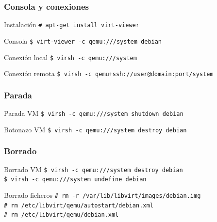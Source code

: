 \documentclass{beamer}
\begin{document}
\begin{frame}
  \frametitle{Consola y conexiones}
  \begin{block}{Instalación}
    \texttt{\# apt-get install virt-viewer}
  \end{block}
  \begin{block}{Consola}
    \texttt{\$ virt-viewer -c qemu:///system debian}
  \end{block}
  \bigskip
  \begin{block}{Conexión local}
    \texttt{\$ virsh -c qemu:///system}
  \end{block}
  \begin{block}{Conexión remota}
    \texttt{\$ virsh -c qemu+ssh://user@domain:port/system}
  \end{block}
\end{frame}

\begin{frame}
  \frametitle{Parada}
  \begin{block}{Parada VM}
    \texttt{\$ virsh -c qemu:///system shutdown debian}
  \end{block}
  \bigskip
  \begin{block}{Botonazo VM}
    \texttt{\$ virsh -c qemu:///system destroy debian}
  \end{block}
\end{frame}

\begin{frame}
  \frametitle{Borrado}
  \begin{block}{Borrado VM}
    \texttt{\$ virsh -c qemu:///system destroy debian} \\
    \texttt{\$ virsh -c qemu:///system undefine debian} \\
  \end{block}
  \bigskip
  \begin{block}{Borrado ficheros}
    \texttt{\# rm -r /var/lib/libvirt/images/debian.img} \\
    \texttt{\# rm /etc/libvirt/qemu/autostart/debian.xml} \\
    \texttt{\# rm /etc/libvirt/qemu/debian.xml} \\
  \end{block}
\end{frame}
\end{document}
